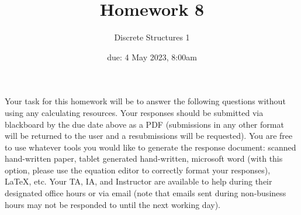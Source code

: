 \documentclass[11pt, oneside]{article}   	%
\title{Homework 8}
\author{Discrete Structures 1}
\date{due: 4 May 2023, 8:00am}							%
\begin{document}
\maketitle

Your task for this homework will be to answer the following questions without using any calculating resources. 
Your responses should be submitted via blackboard by the due date above as a PDF (submissions in any other format will be returned to the user and a resubmissions will be requested). 
You are free to use whatever tools you would like to generate the response document: 
scanned hand-written paper, 
tablet generated hand-written, 
microsoft word (with this option, please use the equation editor to correctly format your responses), 
\LaTeX, etc.
Your TA, IA, and Instructor are available to help during their designated office hours or via email 
(note that emails sent during non-business hours may not be responded to until the next working day). 
\end{document}
